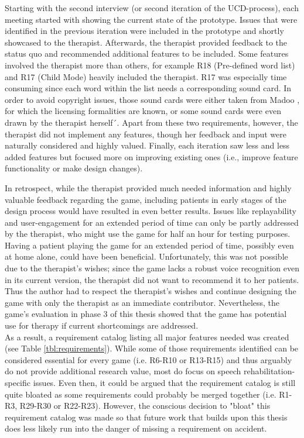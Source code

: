 \documentclass[draft,final]{vutinfth} %
\begin{document}
Starting with the second interview (or second iteration of the UCD-process), each meeting started with showing the current state of the prototype. Issues that were identified in the previous iteration were included in the prototype and shortly showcased to the therapist. Afterwards, the therapist provided feedback to the status quo and recommended additional features to be included. Some features involved the therapist more than others, for example R18 (Pre-defined word list) and R17 (Child Mode) heavily included the therapist. R17 was especially time consuming since each word within the list needs a corresponding sound card. In order to avoid copyright issues, those sound cards were either taken from Madoo \cite{Madoo}, for which the licensing formalities are known, or some sound cards were even drawn by the therapist herself´. Apart from these two requirements, however, the therapist did not implement any features, though her feedback and input were naturally considered and highly valued. Finally, each iteration saw less and less added features but focused more on improving existing ones (i.e., improve feature functionality or make design changes).

In retrospect, while the therapist provided much needed information and highly valuable feedback regarding the game, including patients in early stages of the design process would have resulted in even better results. Issues like replayability and user-engagement for an extended period of time can only be partly addressed by the therapist, who might use the game for half an hour for testing purposes. Having a patient playing the game for an extended period of time, possibly even at home alone, could have been beneficial. Unfortunately, this was not possible due to the therapist's wishes; since the game lacks a robust voice recognition even in its current version, the therapist did not want to recommend it to her patients. Thus the author had to respect the therapist's wishes and continue designing the game with only the therapist as an immediate contributor. Nevertheless, the game's evaluation in phase 3 of this thesis showed that the game has potential use for therapy if current shortcomings are addressed. \\

As a result, a requirement catalog listing all major features needed was created (see Table \ref{tbl:requirements}). While some of those requirements identified can be considered essential for every game (i.e. R6-R10 or R13-R15) and thus arguably do not provide additional research value, most do focus on speech rehabilitation-specific issues. Even then, it could be argued that the requirement catalog is still quite bloated as some requirements could probably be merged together (i.e. R1-R3, R29-R30 or R22-R23). However, the conscious decision to "bloat" this requirement catalog was made so that future work that builds upon this thesis does less likely run into the danger of missing a requirement on accident.
\end{document}
